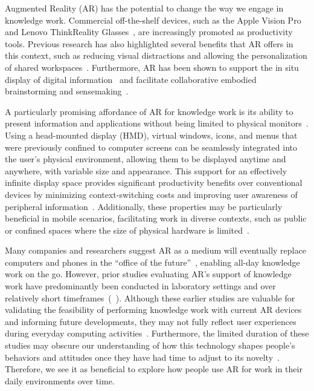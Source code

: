 Augmented Reality (AR) has the potential to change the way we engage in knowledge work.
Commercial off-the-shelf devices, such as the Apple Vision Pro~\cite{apple2023introducingvp} and Lenovo ThinkReality Glasses~\cite{lenovo2025thinkreality}, are increasingly promoted as productivity tools.
Previous research has also highlighted several benefits that AR offers in this context, such as reducing visual distractions and allowing the personalization of shared workspaces~\cite{lee2022partitioning}.
Furthermore, AR has been shown to support the in situ display of digital information~\cite{chen2023papertoplace} and facilitate collaborative embodied brainstorming and sensemaking~\cite{luo2022placement}.

A particularly promising affordance of AR for knowledge work is its ability to present information and applications without being limited to physical monitors~\cite{pavanatto2024xrwild}.
Using a head-mounted display (HMD), virtual windows, icons, and menus that were previously confined to computer screens can be seamlessly integrated into the user's physical environment, allowing them to be displayed anytime and anywhere, with variable size and appearance.
This support for an effectively infinite display space provides significant productivity benefits over conventional devices by minimizing context-switching costs and improving user awareness of peripheral information~\cite{mcgill2020seatedvrworkspace}.
Additionally, these properties may be particularly beneficial in mobile scenarios, facilitating work in diverse contexts, such as public or confined spaces where the size of physical hardware is limited~\cite{biener2024xrworkpublic}.

Many companies and researchers suggest AR as a medium will eventually replace computers and phones in the ``office of the future''~\cite{gruber2018officefuture}, enabling all-day knowledge work on the go. 
However, prior studies evaluating AR's support of knowledge work have predominantly been conducted in laboratory settings and over relatively short timeframes~(\eg~\cite{biener2024xrworkpublic,pavanatto2024xrwild}).
Although these earlier studies are valuable for validating the feasibility of performing knowledge work with current AR devices and informing future developments,
they may not fully reflect user experiences during everyday computing activities~\cite{abowd2000chartingubicomp}. 
Furthermore, the limited duration of these studies may obscure our understanding of how this technology shapes people's behaviors and attitudes once they have had time to adjust to its novelty~\cite{bailenson2024seeing}.
Therefore, we see it as beneficial to explore how people use AR for work in their daily environments over time.


